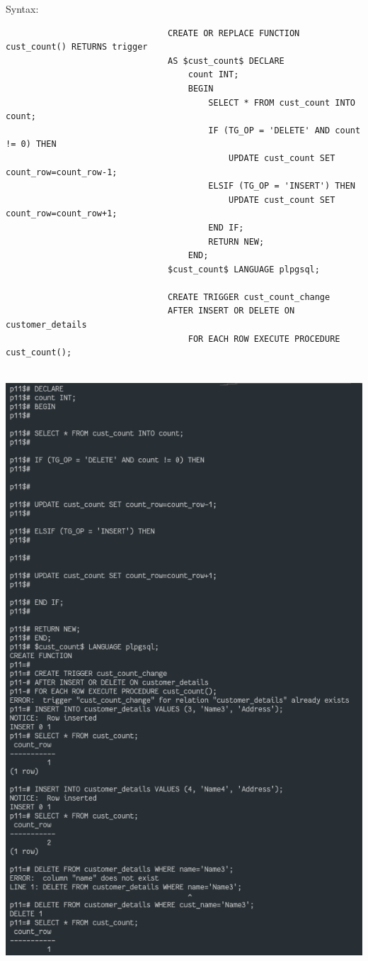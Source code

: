 \documentclass[13pt,oneside]{book}
\begin{document}
\begin{itemize}
									Syntax:
									\begin{verbatim}
								CREATE OR REPLACE FUNCTION cust_count() RETURNS trigger 
								AS $cust_count$ DECLARE
									count INT;
									BEGIN
										SELECT * FROM cust_count INTO count;
										IF (TG_OP = 'DELETE' AND count != 0) THEN
											UPDATE cust_count SET count_row=count_row-1;
										ELSIF (TG_OP = 'INSERT') THEN
											UPDATE cust_count SET count_row=count_row+1;
										END IF;
										RETURN NEW;
									END;
								$cust_count$ LANGUAGE plpgsql;
								
								CREATE TRIGGER cust_count_change
								AFTER INSERT OR DELETE ON customer_details
									FOR EACH ROW EXECUTE PROCEDURE cust_count();
									
									\end{verbatim}
									\includegraphics[]{img/p10/ss3.png}
									

\end{itemize}
\end{document}
